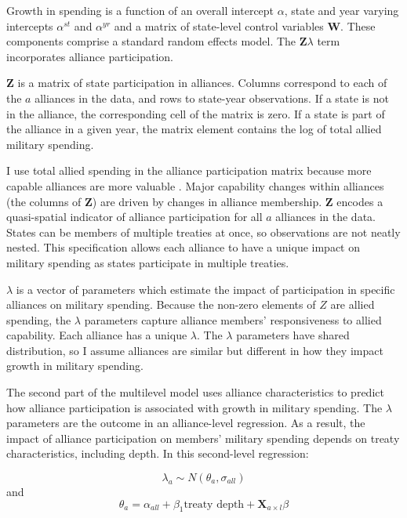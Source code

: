 \documentclass[12pt]{article}
\begin{document}
Growth in spending is a function of an overall intercept $\alpha$, state and year varying intercepts $\alpha^{st}$ and $\alpha^{yr}$ and a matrix of state-level control variables $\textbf{W}$.
These components comprise a standard random effects model. 
The $\textbf{Z} \lambda$ term incorporates alliance participation.


$\textbf{Z}$ is a matrix of state participation in alliances. 
Columns correspond to each of the $a$ alliances in the data, and rows to state-year observations. 
If a state is not in the alliance, the corresponding cell of the matrix is zero.
If a state is part of the alliance in a given year, the matrix element contains the log of total allied military spending.


I use total allied spending in the alliance participation matrix because more capable alliances are more valuable \citep{Johnsonetal2015}.
Major capability changes within alliances (the columns of \textbf{Z}) are driven by changes in alliance membership. 
$\textbf{Z}$ encodes a quasi-spatial indicator of alliance participation for all $a$ alliances in the data. 
States can be members of multiple treaties at once, so observations are not neatly nested. 
This specification allows each alliance to have a unique impact on military spending as states participate in multiple treaties. 


$\lambda$ is a vector of parameters which estimate the impact of participation in specific alliances on military spending. 
Because the non-zero elements of $Z$ are allied spending, the $\lambda$ parameters capture alliance members' responsiveness to allied capability. 
Each alliance has a unique $\lambda$. 
The $\lambda$ parameters have shared distribution, so I assume alliances are similar but different in how they impact growth in military spending. 


The second part of the multilevel model uses alliance characteristics to predict how alliance participation is associated with growth in military spending. 
The $\lambda$ parameters are the outcome in an alliance-level regression.
As a result, the impact of alliance participation on members' military spending depends on treaty characteristics, including depth. 
In this second-level regression: 


\begin{equation}
\lambda_{a} \sim N(\theta_{a}, \sigma_{all})
\end{equation} 
and 
\begin{equation}
\theta_{a} = \alpha_{all} + \beta_1 \mbox{treaty depth} + \textbf{X}_{a \times l} \beta
\end{equation}
\end{document}
